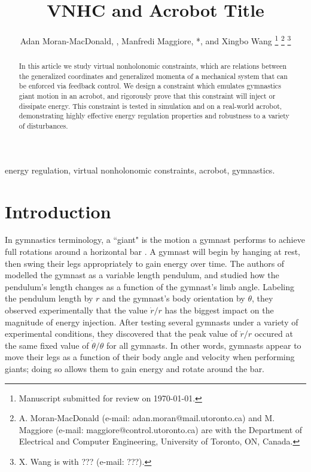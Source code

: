\documentclass[journal,twoside,web, onecolumn, draftcls]{ieeecolor}
\newcommand*{\Title}{VNHC and Acrobot Title}
\begin{document}
\title{\Title}
\author{Adan Moran-MacDonald, , Manfredi Maggiore,
*, and Xingbo Wang
\thanks{Manuscript submitted for review on \today.}
\thanks{A. Moran-MacDonald (e-mail: adan.moran@mail.utoronto.ca) and
M. Maggiore (e-mail: maggiore@control.utoronto.ca) are with the Department of
Electrical and Computer Engineering, University of Toronto, ON, Canada.}
\thanks{X. Wang is with ??? (e-mail: ???).}
} %

\maketitle

\begin{abstract}
    In this article we study virtual nonholonomic constraints, which are
    relations between the generalized coordinates and generalized momenta of a
    mechanical system that can be enforced via feedback control.
    We design a constraint which emulates gymnastics giant motion in an
    acrobot, and rigorously prove that this constraint will inject or dissipate
    energy.
    This constraint is tested in simulation and on a real-world acrobot,
    demonstrating highly effective energy regulation properties and robustness
    to a variety of disturbances.
\end{abstract}

\begin{IEEEkeywords}
    energy regulation, virtual nonholonomic constraints, acrobot, gymnastics.
\end{IEEEkeywords}

\section{Introduction}\label{sec:introduction}

In gymnastics terminology, a ``giant" is the motion a gymnast performs to
achieve full rotations around a horizontal bar \cite{usagym_giant}. 
A gymnast will begin by hanging at rest, then swing their legs
appropriately to gain energy over time.
The authors of \cite{pendulum_length_giant_gymnastics} modelled the gymnast as a
variable length pendulum, and studied how the pendulum's length changes as a
function of the gymnast's limb angle.
Labeling the pendulum length by \(r\) and the gymnast's body orientation
by \(\theta\), they observed experimentally that the value \(\dot{r}/r\) has
the biggest impact on the magnitude of energy injection. 
After testing several gymnasts under a variety of experimental conditions, 
they discovered that the peak value of \(\dot{r}/r\) occured at the same fixed
value of \(\dot{\theta}/\theta\) for all gymnasts.
In other words, gymnasts appear to move their legs as a function of their body
angle and velocity when performing giants; 
doing so allows them to gain energy and rotate around the bar.
\end{document}
